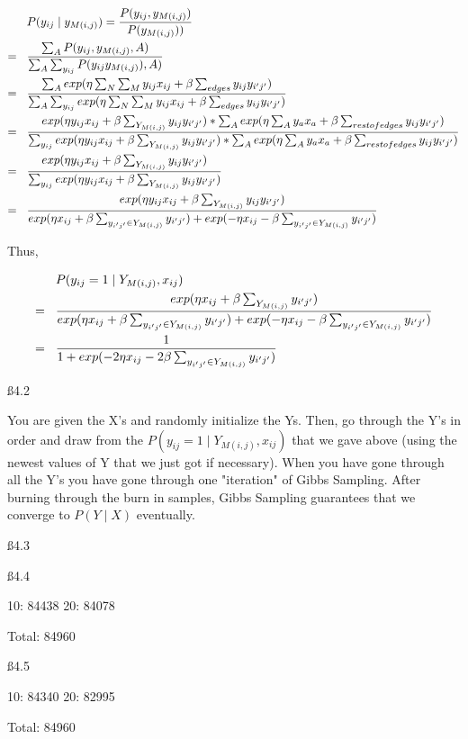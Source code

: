 \begin{align*}
& P(y_{ij} \mid y_{M(i,j)}) = \frac{P(y_{ij}, y_{M(i,j)})}{ P(y_{M(i,j)}))} \\ = \hspace{3 mm} &
\frac{\sum_A P(y_{ij}, y_{M(i,j)}, A)}{ \sum_A \sum_{y_{ij}} P(y_{ij} y_{M(i,j)}),A)} \\ = \hspace{3 mm} &
\frac{\sum_A exp(\eta \sum_N \sum_M y_{ij}x_{ij} +  \beta \sum_{edges} y_{ij}y_{i'j'})}{ \sum_A \sum_{y_{ij}} exp(\eta \sum_N \sum_M y_{ij}x_{ij} +  \beta \sum_{edges} y_{ij}y_{i'j'}) } \\ = \hspace{3 mm} & 
\frac{exp(\eta y_{ij}x_{ij} + \beta \sum_{Y_{M(i,j)}} y_{ij}y_{i'j'}) * \sum_A exp(\eta \sum_A y_a x_a + \beta \sum_{restofedges} y_{ij}y_{i'j'})}{\sum_{y_{ij}} exp(\eta y_{ij}x_{ij} + \beta \sum_{Y_{M(i,j)}} y_{ij}y_{i'j'}) * \sum_A exp(\eta \sum_A y_a x_a + \beta \sum_{restofedges} y_{ij}y_{i'j'})} \\ = \hspace{3 mm} &
\frac{exp(\eta y_{ij}x_{ij} + \beta \sum_{Y_{M(i,j)}} y_{ij}y_{i'j'})}{\sum_{y_{ij}} exp(\eta y_{ij}x_{ij} + \beta \sum_{Y_{M(i,j)}} y_{ij}y_{i'j'})}
\\ = \hspace{3 mm} & \frac{exp(\eta y_{ij}x_{ij} + \beta \sum_{Y_{M(i,j)}} y_{ij}y_{i'j'})}{exp(\eta x_{ij} + \beta \sum_{y_{i'j'} \in Y_{M(i,j)}} y_{i'j'}) + exp(-\eta x_{ij} - \beta \sum_{y_{i'j'} \in Y_{M(i,j)}} y_{i'j'})}
\end{align*}

Thus, 

\begin{align*}
& P(y_{ij} = 1 \mid Y_{M(i,j)}, x_{ij}) \\ = \hspace{3 mm} & \frac{exp(\eta x_{ij} + \beta \sum_{Y_{M(i,j)}} y_{i'j'})}{exp(\eta x_{ij} + \beta \sum_{y_{i'j'} \in Y_{M(i,j)}} y_{i'j'}) + exp(-\eta x_{ij} - \beta \sum_{y_{i'j'} \in Y_{M(i,j)}} y_{i'j'})} \\ = \hspace{3 mm} &
\frac{1}{1+ exp(-2\eta x_{ij} - 2\beta \sum_{y_{i'j'} \in Y_{M(i,j)}} y_{i'j'})}
\end{align*}

\ss {4.2}

You are given the X's and randomly initialize the Ys. Then, go through the Y's in order and draw from the $P(y_{ij} = 1 \mid Y_{M(i,j)}, x_{ij})$ that we gave above (using the newest values of Y that we just got if necessary). When you have gone through all the Y's you have gone through one "iteration" of Gibbs Sampling. After burning through the burn in samples, Gibbs Sampling guarantees that we converge to $P(Y \mid X)$ eventually.

\ss {4.3}

\ss{4.4}

10: 84438
20: 84078

Total: 84960

\ss{4.5}

10: 84340
20: 82995

Total: 84960

